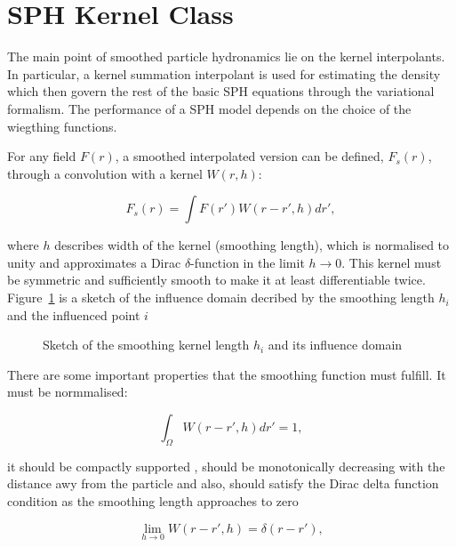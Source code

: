 \section{SPH Kernel Class}
\label{sec:section 5}

The main point of smoothed particle hydronamics lie on the kernel interpolants. In particular, a kernel summation interpolant is used for estimating the density
which then govern the rest of the basic SPH equations through the variational formalism. The performance of a SPH model depends on the choice of the wiegthing functions. \par
For any field $F(r)$, a smoothed interpolated version can be defined, $F_{s}(r)$, through a convolution with a kernel $W(r,h)$:

\begin{equation}
 F_{s}(r) = \int F(r') W(r-r',h)dr' ,
\end{equation}

where $h$ describes width of the kernel (smoothing length), which is normalised to unity and approximates a Dirac $\delta$-function in the limit $h\rightarrow 0$. This kernel must be symmetric
and sufficiently smooth to make it at least differentiable twice. Figure~\ref{fig:Bild3.9} is a sketch of the influence domain decribed by the smoothing length $h_{i}$ and the influenced
point $i$


\begin{figure}[H]
\centering
  \begin{footnotesize}
  
  \caption[Sketch of the smoothing kernel length $h_{i}$ and its influence domainSketch of the smoothing kernel length $h_{i}$ and its influence domain]{Sketch of the smoothing kernel length $h_{i}$ and its influence domain}
  \label{fig:Bild3.9}
  \end{footnotesize}
\end{figure} 

There are some important properties that the smoothing function must fulfill. It must be normmalised:

\begin{equation}
 \int_{\Omega}W(r-r',h)dr'= 1 ,
\end{equation}

it should be compactly supported , should be monotonically decreasing with the distance awy from the particle and also, should satisfy the Dirac delta function condition as the smoothing
length approaches to zero 

\begin{equation}
 \lim_{h\to 0} W(r-r',h)= \delta(r-r') ,
\end{equation}

